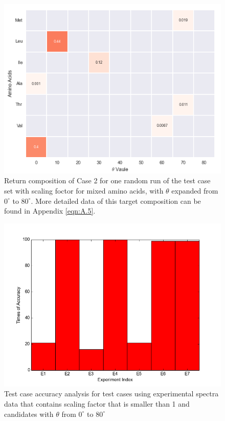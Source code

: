 \begin{figure}[!ht] 
\centering
\includegraphics[scale=0.9]{Figures/chapter6_figure_two.png}
\caption{Return composition of Case 2 for one random run of the test case set with scaling foctor for mixed amino acids, with $\theta$ expanded from $0^{\circ}$ to $80^{\circ}$. More detailed data of this target composition can be found in Appendix \ref{eqn:A.5}.} \label{fig:6.2}
\end{figure}

\begin{figure}[!ht] 
\centering
\includegraphics[scale=0.6]{Figures/chapter6_1.png}
\caption{Test case accuracy analysis for test cases using experimental spectra data that contains scaling factor that is smaller than 1 and candidates with $\theta$ from $0^{\circ}$ to $80^{\circ}$}
\label{fig:6.3}
\end{figure}

